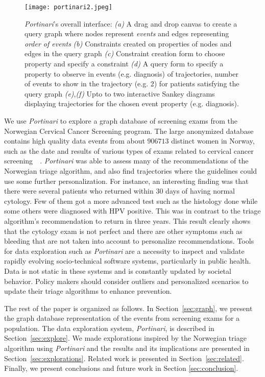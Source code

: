 \documentclass[10pt, conference]{IEEEtran}
\begin{document}
\begin{figure*}[!ht]
\centering
\texttt{[image: portinari2.jpeg]}
\caption{\textit{Portinari}'s overall interface: \textit{(a)} A drag and drop canvas to create a query graph where nodes represent \emph{events} and edges representing \emph{order of events} \textit{(b)} Constraints created on properties of nodes and edges in the query graph \textit{(c)} Constraint creation form to choose property and specify a constraint \textit{(d)} A query form to specify a property to observe in events (e.g. diagnosis) of trajectories, number of events to show in the trajectory (e.g. 2) for patients satisfying the query graph \textit{(e)},\textit{(f)} Upto to two interactive Sankey diagrams displaying trajectories for the chosen event property (e.g. diagnosis).}
\label{fig:portinari}
\end{figure*} 



We use \textit{Portinari} to explore a graph database of screening exams from the Norwegian Cervical Cancer Screening program. The  large anonymized database contains high quality data events from about $906713$ distinct women in Norway, such as the date and results of various types of exams related to cervical cancer screening~\cite{NorwegianCancerRegistry1}~\cite{NorwegianCancerRegistry2}.  \textit{Portinari} was able to assess  many of the recommendations of the Norwegian triage algorithm, and also find trajectories where the guidelines could use some further personalization. For instance, an interesting finding was that there were several patients who returned within 30 days of having normal cytology. Few of them got a more advanced test such as the histology done while some others were diagnosed with HPV positive. This was in contrast to the triage algorithm's recommendation to return in three years. This result clearly shows that the cytology exam is not perfect and there are other symptoms such as bleeding that are not taken into account to personalize recommendations. Tools for data exploration such as \textit{Portinari} are a necessity to inspect and validate rapidly evolving socio-technical software systems, particularly in public health. Data is not static in these systems and is constantly updated by societal behavior. Policy makers should consider outliers and personalized scenarios to update their triage algorithms to enhance prevention.

The rest of the paper is organized as follows. In Section~\ref{sec:graph}, we present the graph database representation of the events from screening exams for a population. The data exploration system, \textit{Portinari}, is described in Section~\ref{sec:explore}.
We made explorations inspired by the Norwegian triage algorithm using \textit{Portinari} and the results and its implications are presented in Section~\ref{sec:explorations}. Related work is presented in Section~\ref{sec:related}. Finally, we present conclusions and future work in Section \ref{sec:conclusion}.
\end{document}
